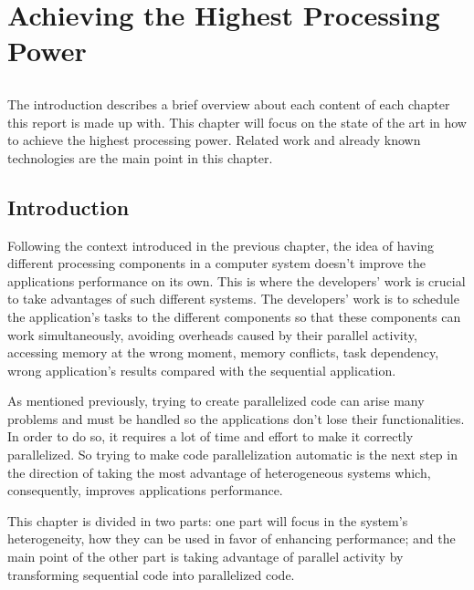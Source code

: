 \chapter{Achieving the Highest Processing Power} \label{chap:sota1}
\section*{}

The introduction describes a brief overview about each content of each chapter this report is made up with. This chapter will focus on the state of the art in how to achieve the highest processing power. Related work and already known technologies are the main point in this chapter.  


\section{Introduction}

Following the context introduced in the previous chapter, the idea of having different processing components in a computer system doesn't improve the applications performance on its own. This is where the developers' work is crucial to take advantages of such different systems. The developers' work is to schedule the application's tasks to the different components so that these components can work simultaneously, avoiding overheads caused by their parallel activity, accessing memory at the wrong moment, memory conflicts, task dependency, wrong application's results compared with the sequential application.~\cite{Lee}

As mentioned previously, trying to create parallelized code can arise many problems and must be handled so the applications don't lose their functionalities. In order to do so, it requires a lot of time and effort to make it correctly parallelized. So trying to make code parallelization automatic is the next step in the direction of taking the most advantage of heterogeneous systems which, consequently, improves applications performance. 

This chapter is divided in two parts: one part will focus in the system's heterogeneity, how they can be used in favor of enhancing performance; and the main point of the other part is taking advantage of parallel activity by transforming sequential code into parallelized code.


